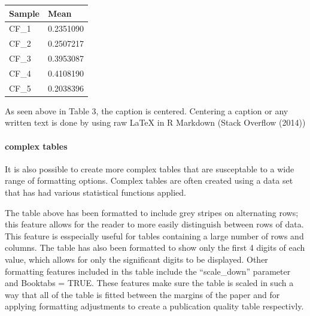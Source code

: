 \documentclass[]{elsarticle} %
\begin{document}
\begin{longtable}[]{@{}ll@{}}
\toprule
Sample & Mean\tabularnewline
\midrule
\endhead
CF\_1 & 0.2351090\tabularnewline
CF\_2 & 0.2507217\tabularnewline
CF\_3 & 0.3953087\tabularnewline
CF\_4 & 0.4108190\tabularnewline
CF\_5 & 0.2038396\tabularnewline
\bottomrule
\end{longtable}

As seen above in Table 3, the caption is centered. Centering a caption
or any written text is done by using raw LaTeX in R Markdown (Stack
Overflow (2014))

\hypertarget{complex-tables}{%
\paragraph{complex tables}\label{complex-tables}}

It is also possible to create more complex tables that are susceptable
to a wide range of formatting options. Complex tables are often created
using a data set that has had various statistical functions applied.

\begin{table}[!h]

\caption{\label{tab:descriptive stats}Stat analysis results for dataset}
\centering
{}
\end{table}

The table above has been formatted to include grey stripes on
alternating rows; this feature allows for the reader to more easily
distinguish between rows of data. This feature is esspecially useful for
tables containing a large number of rows and columns. The table has also
been formatted to show only the first 4 digits of each value, which
allows for only the significant digits to be displayed. Other formatting
features included in ths table include the ``scale\_down'' parameter and
Booktabs = TRUE. These features make sure the table is scaled in such a
way that all of the table is fitted between the margins of the paper and
for applying formatting adjustments to create a publication quality
table respectivly.
\end{document}
